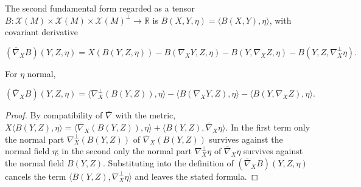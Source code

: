 \begin{definition}
  \label{def:dc-ch6-3-covderiv-B}
  \leanok
  The second fundamental form regarded as a tensor
  $B:\mathcal{X}(M)\times\mathcal{X}(M)\times\mathcal{X}(M)^\perp\to\mathbb{R}$
  is $B(X,Y,\eta)=\langle B(X,Y),\eta\rangle$, with covariant derivative

  $$
  (\overline{\nabla}_X B)(Y,Z,\eta)=X(B(Y,Z,\eta))-B(\nabla_X Y,Z,\eta)-B(Y,\nabla_X Z,\eta)-B(Y,Z,\nabla_X^\perp\eta).
  $$
\end{definition}

\begin{lemma}
  \label{lem:dc-ch6-3-covderiv-reduce}
  \leanok
  For $\eta$ normal,

  $$
  (\overline{\nabla}_X B)(Y,Z,\eta)=\langle\nabla_X^\perp(B(Y,Z)),\eta\rangle-\langle B(\nabla_X Y,Z),\eta\rangle-\langle B(Y,\nabla_X Z),\eta\rangle.
  $$
\end{lemma}
\begin{proof}
  \leanok
  By compatibility of $\overline{\nabla}$ with the metric,
  $X\langle B(Y,Z),\eta\rangle
  =\langle\overline{\nabla}_X(B(Y,Z)),\eta\rangle
  +\langle B(Y,Z),\overline{\nabla}_X\eta\rangle$. In the first term only the
  normal part $\nabla^\perp_X(B(Y,Z))$ of $\overline{\nabla}_X(B(Y,Z))$
  survives against the normal field $\eta$; in the second only the normal part
  $\nabla^\perp_X\eta$ of $\overline{\nabla}_X\eta$ survives against the normal
  field $B(Y,Z)$. Substituting into the definition of
  $(\overline{\nabla}_X B)(Y,Z,\eta)$ cancels the term
  $\langle B(Y,Z),\nabla^\perp_X\eta\rangle$ and leaves the stated formula.
\end{proof}

